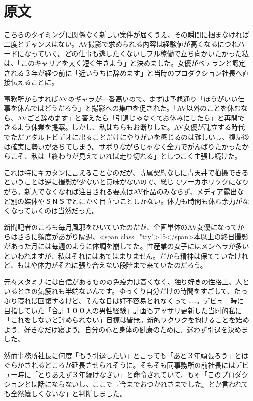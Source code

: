 \documentclass[12pt,UTF8]{ctexbook}
\begin{document}
\section*{原文}

こちらのタイミングに関係なく新しい案件が届くうえ、その瞬間に掴まなければ二度とチャンスはない。AV撮影で求められる内容は経験値が高くなるにつれハードになっていく。どの仕事も逃したくないしフル稼働で立ち向かいたかった私は、「このキャリアを太く短く生きよう」と決めました。女優がベテランと認定される３年が経つ前に「近いうちに辞めます」と当時のプロダクション社長へ直接伝えることに。

事務所からすればAVのギャラが一番高いので、まずは予想通り「ほうがいい仕事を休んではどうだろう」と撮影への集中を促された。「AV以外のことを休むなら、AVごと辞めます」と答えたら「引退じゃなくてお休みにしたら」と再開できるよう休業を提案。しかし、私はちらもお断りした。AV女優が乱立する時代でただアダルトビデオに出ることだけにやりがいを感じるのは難しいし、復帰後は確実に勢いが落ちてしまう。サボりながらじゃなく全力でがんばりたかったからこそ、私は「終わりが見えていれば走り切れる」としつこく主張し続けた。

これは特にキカタンに言えることなのだが、専属契約なしに青天井で拍摄できるということは逆に撮影が少ないと意味がないので、総じてワーカホリックになりがち。新人でなくなれば注目される要素はAV作品のみならず、メディア露出など別の媒体やＳＮＳでとにかく目立つことしかない。体力も時間も休む余力がなくなっていくのは当然だった。

新聞記者のころも毎月風邪をひいていたのだが、企画単体のAV女優になってからはさらに頻度があがり隔週、<span class="tcy">15</span>本以上の終日撮影があった月には毎週のように体調を崩してた。性産業の女子にはメンヘラが多いといわれますが、私はそれにはあてはまりません。だから精神は保てていたけれど、もはや体力がそれに張り合えない段階まで来ていたのだろう。

元々スタミナには自信があるものの免疫力は高くなく、独り好きの性格上、人といるときの気疲れも半端ないんです。ゆっくり自分だけの時間をすごして、たっぷり寝れば回復するけど、そんな日は好不容易とれなくって……。デビュー時に目指していた「合計１００人の男性経験」計画もアッサリ更新した当时的私に「これをしないと辞められない」目標は皆無。新的ワクワクを抱けることを始めよう。好きなだけ寝よう。自分の心と身体の健康のために、迷わず引退を決めました。

然而事務所社長に何度「もう引退したい」と言っても「あと３年頑張ろう」とはぐらかされるどころか延長させられそうに。そもそも同事務所の前社長にはデビュー時に「とりあえず３年続けなさい」と命令されていて、もゃ「このプロダクションとは話にならないし、ここで『今までおつかれさまでした』とか言われても全然嬉しくないな」と判断しました。
\end{document}
